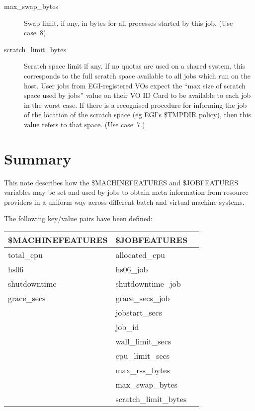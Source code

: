 \documentclass[12pt,a4paper]{article}
\begin{document}
\begin{description}
\item[max\_swap\_bytes] Swap limit, if any, in bytes for all processes
started by this job. (Use case~8) 

\item[scratch\_limit\_bytes] Scratch space limit if any. If no quotas
are used on a shared system, this corresponds to the full scratch 
space available to all jobs which run on the host. User jobs from
EGI-registered VOs expect the ``max size of scratch space used by jobs''
value on their VO ID Card\cite{VOIDCARD} to be available to each job in the worst case.
If there is a recognised procedure for informing the job of the location
of the scratch space (eg EGI's \$TMPDIR policy\cite{EGITMPDIR}), then this value refers to that
space. (Use case~7.) 

\end{description}

\clearpage

\section{Summary}
\label{sec:Summary}

This note describes how the \$MACHINEFEATURES and \$JOBFEATURES variables
may be set and used by jobs to obtain meta information from resource
providers in a uniform way across different batch and virtual machine
systems.
\vspace{0.5cm}

The following key/value pairs have been defined:

\begin{center}
\begin{tabular}{|l|l|p{5cm}}
\hline
\$MACHINEFEATURES & \$JOBFEATURES \\
\hline
total\_cpu & allocated\_cpu \\
hs06 & hs06\_job \\
shutdowntime & shutdowntime\_job \\
grace\_secs & grace\_secs\_job \\
 & jobstart\_secs \\
 & job\_id \\
 & wall\_limit\_secs \\
 & cpu\_limit\_secs \\
 & max\_rss\_bytes \\
 & max\_swap\_bytes \\
 & scratch\_limit\_bytes \\
\hline
\end{tabular}
\end{center}
\end{document}
